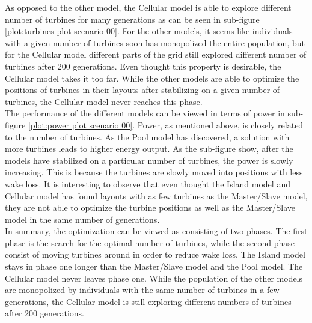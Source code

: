 \noindent As opposed to the other model, the Cellular model is able to explore different number of turbines for many generations as can be seen in sub-figure \ref{plot:turbines plot scenario 00}. For the other models, it seems like individuals with a given number of turbines soon has monopolized the entire population, but for the Cellular model different parts of the grid still explored different number of turbines after 200 generations. Even thought this property is desirable, the Cellular model takes it too far. While the other models are able to optimize the positions of turbines in their layouts after stabilizing on a given number of turbines, the Cellular model never reaches this phase.\\

\noindent The performance of the different models can be viewed in terms of power in sub-figure \ref{plot:power plot scenario 00}. Power, as mentioned above, is closely related to the number of turbines. As the Pool model has discovered, a solution with more turbines leads to higher energy output. As the sub-figure show, after the models have stabilized on a particular number of turbines, the power is slowly increasing. This is because the turbines are slowly moved into positions with less wake loss. It is interesting to observe that even thought the Island model and Cellular model has found layouts with as few turbines as the Master/Slave model, they are not able to optimize the turbine positions as well as the Master/Slave model in the same number of generations. \\

\noindent In summary, the optimization can be viewed as consisting of two phases. The first phase is the search for the optimal number of turbines, while the second phase consist of moving turbines around in order to reduce wake loss. The Island model stays in phase one longer than the Master/Slave model and the Pool model. The Cellular model never leaves phase one. While the population of the other models are monopolized by individuals with the same number of turbines in a few generations, the Cellular model is still exploring different numbers of turbines after 200 generations. \\

